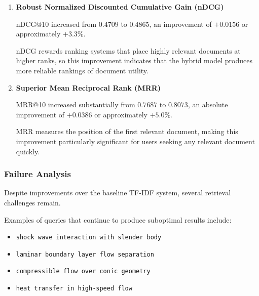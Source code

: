 \begin{enumerate}
    Mean Average Precision@10 increased from the baseline value of $0.3467$ to $0.3606$, an absolute improvement of $+0.0139$ or approximately $+4.0\%$.
    
    MAP is a single-value summary of precision-recall performance, so this improvement indicates better overall ranking quality across the entire ranked list.
    
    \item \textbf{Robust Normalized Discounted Cumulative Gain (nDCG)}
    
    nDCG@10 increased from $0.4709$ to $0.4865$, an improvement of $+0.0156$ or approximately $+3.3\%$.
    
    nDCG rewards ranking systems that place highly relevant documents at higher ranks, so this improvement indicates that the hybrid model produces more reliable rankings of document utility.
    
    \item \textbf{Superior Mean Reciprocal Rank (MRR)}
    
    MRR@10 increased substantially from $0.7687$ to $0.8073$, an absolute improvement of $+0.0386$ or approximately $+5.0\%$.
    
    MRR measures the position of the first relevant document, making this improvement particularly significant for users seeking any relevant document quickly.
\end{enumerate}

\vspace{0.2cm}

\subsubsection{Failure Analysis}

Despite improvements over the baseline TF-IDF system, several retrieval challenges remain.

Examples of queries that continue to produce suboptimal results include:

\begin{itemize}
    \item \texttt{shock wave interaction with slender body}
    \item \texttt{laminar boundary layer flow separation}
    \item \texttt{compressible flow over conic geometry}
    \item \texttt{heat transfer in high-speed flow}
\end{itemize}

